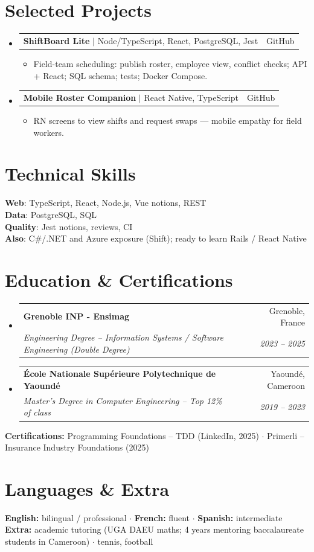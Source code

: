 \documentclass[letterpaper,10.5pt]{article}
\makeatletter
\newcommand{\resumeItem}[1]{\item\small{#1 \vspace{-1.5pt}}}
\newcommand{\resumeSubheading}[4]{
  \vspace{-1pt}\item
    \begin{tabular*}{0.97\textwidth}[t]{l@{\extracolsep{\fill}}r}
      \textbf{#1} & #2 \\
      \textit{\small#3} & \textit{\small #4} \\
    \end{tabular*}\vspace{-5pt}
}
\newcommand{\resumeProjectHeading}[2]{
    \item
    \begin{tabular*}{0.97\textwidth}{l@{\extracolsep{\fill}}r}
      \small#1 & #2 \\
    \end{tabular*}\vspace{-5pt}
}
\newcommand{\resumeSubHeadingListStart}{\begin{itemize}[leftmargin=0.15in, label={}]}
\newcommand{\resumeSubHeadingListEnd}{\end{itemize}}
\newcommand{\resumeItemListStart}{\begin{itemize}[leftmargin=0.18in]}
\newcommand{\resumeItemListEnd}{\end{itemize}\vspace{-3pt}}
\makeatother
\begin{document}
\section{Selected Projects}

\resumeSubHeadingListStart

  \resumeProjectHeading
    {\textbf{ShiftBoard Lite} $|$ Node/TypeScript, React, PostgreSQL, Jest}{GitHub}
    \resumeItemListStart
      \resumeItem{Field-team scheduling: publish roster, employee view, conflict checks; API + React; SQL schema; tests; Docker Compose.}
    \resumeItemListEnd
  \resumeProjectHeading
    {\textbf{Mobile Roster Companion} $|$ React Native, TypeScript}{GitHub}
    \resumeItemListStart
      \resumeItem{RN screens to view shifts and request swaps --- mobile empathy for field workers.}
    \resumeItemListEnd
\resumeSubHeadingListEnd

\section{Technical Skills}

\begin{itemize}[leftmargin=0.15in, label={}]
  \small{\item{
\textbf{Web}: TypeScript, React, Node.js, Vue notions, REST \\
\textbf{Data}: PostgreSQL, SQL \\
\textbf{Quality}: Jest notions, reviews, CI \\
\textbf{Also}: C\#/.NET and Azure exposure (Shift); ready to learn Rails / React Native
  }}
\end{itemize}

\section{Education \& Certifications}

\resumeSubHeadingListStart
  \resumeSubheading
    {Grenoble INP - Ensimag}{Grenoble, France}
    {Engineering Degree -- Information Systems / Software Engineering (Double Degree)}{2023 -- 2025}
  \resumeSubheading
    {\'Ecole Nationale Sup\'erieure Polytechnique de Yaound\'e}{Yaound\'e, Cameroon}
    {Master's Degree in Computer Engineering -- Top 12\% of class}{2019 -- 2023}
\resumeSubHeadingListEnd
\small{
\textbf{Certifications:} Programming Foundations -- TDD (LinkedIn, 2025) $\cdot$ Primerli -- Insurance Industry Foundations (2025)
}

\section{Languages \& Extra}
\small{
\textbf{English:} bilingual / professional $\cdot$ \textbf{French:} fluent $\cdot$ \textbf{Spanish:} intermediate \\
\textbf{Extra:} academic tutoring (UGA DAEU maths; 4 years mentoring baccalaureate students in Cameroon) $\cdot$ tennis, football
}
\end{document}
